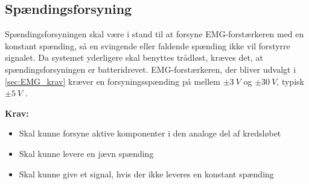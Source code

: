 \subsection{Spændingsforsyning} \label{sec:krav_spaending}
Spændingsforsyningen skal være i stand til at forsyne EMG-forstærkeren med en konstant spænding, så en svingende eller faldende spænding ikke vil forstyrre signalet. Da systemet yderligere skal benyttes trådløst, kræves det, at spændingsforsyningen er batteridrevet. EMG-forstærkeren, der bliver udvalgt i \autoref{sec:EMG_krav} kræver en forsyningsspænding på mellem $\pm 3~V$ og $\pm 30~V$, typisk $\pm 5~V$ \citep{advancertech2013}.


\textbf{Krav:}
\begin{itemize} 
\item Skal kunne forsyne aktive komponenter i den analoge del af kredsløbet
\item Skal kunne levere en jævn spænding
\item Skal kunne give et signal, hvis der ikke leveres en konstant spænding
\end{itemize}
